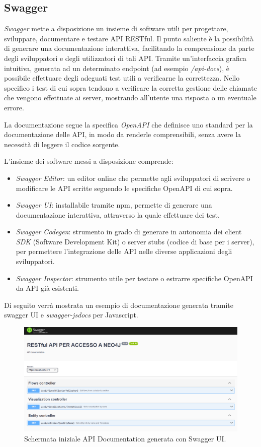 \thispagestyle{mystyle}

\subsection{Swagger}
\emph{Swagger} \cite{Swagger} mette a disposizione un insieme di software utili per progettare, sviluppare, documentare e testare API RESTful. Il punto saliente è la possibilità di generare una documentazione interattiva, facilitando la comprensione da parte degli sviluppatori e degli utilizzatori di tali API.
Tramite un'interfaccia grafica intuitiva, generata ad un determinato endpoint (ad esempio \emph{/api-docs}), è possibile  effettuare degli adeguati test utili a verificarne la correttezza.
Nello specifico i test di cui sopra tendono a verificare la corretta gestione delle chiamate che vengono effettuate ai server, mostrando all'utente una risposta o un eventuale errore.

La documentazione segue la specifica \textit{OpenAPI} che definisce uno standard per la documentazione delle API, in modo da renderle comprensibili, senza avere la necessità di leggere il codice sorgente.

L'insieme dei software messi a disposizione comprende:
\begin{itemize}
    \item \emph{Swagger Editor}: un editor online che permette agli sviluppatori di scrivere o modificare le API scritte seguendo le specifiche OpenAPI di cui sopra.
    \item \emph{Swagger UI}: installabile tramite npm, permette di generare una documentazione interattiva, attraverso la quale effettuare dei test.

    \item \emph{Swagger Codegen}: strumento in grado di generare in autonomia dei client \emph{SDK} (Software Development Kit) o server stubs (codice di base per i server), per permettere l'integrazione delle API nelle diverse applicazioni degli sviluppatori.

    \item \emph{Swagger Inspector}: strumento utile per testare o estrarre specifiche OpenAPI da API già esistenti.
\end{itemize}

Di seguito verrà mostrata un esempio di documentazione generata tramite swagger UI e \emph{swagger-jsdocs} per Javascript.

\begin{figure}[H]
    \centering \includegraphics[keepaspectratio=true,scale=0.3]{Images/SchermataInizialeDocs.png}
    \caption{Schermata iniziale API Documentation generata con Swagger UI.}
\end{figure}

\thispagestyle{mystyle}


